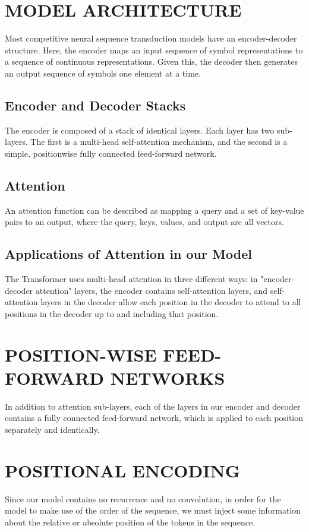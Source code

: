 \documentclass[conference]{IEEEtran}
\begin{document}
\section{MODEL ARCHITECTURE}
Most competitive neural sequence transduction models have an encoder-decoder structure. Here, the encoder maps an input sequence of symbol representations to a sequence of continuous representations. Given this, the decoder then generates an output sequence of symbols one element at a time.

\subsection{Encoder and Decoder Stacks}
The encoder is composed of a stack of identical layers. Each layer has two sub-layers. The first is a multi-head self-attention mechanism, and the second is a simple, positionwise fully connected feed-forward network.

\subsection{Attention}
An attention function can be described as mapping a query and a set of key-value pairs to an output, where the query, keys, values, and output are all vectors.

\subsection{Applications of Attention in our Model}
The Transformer uses multi-head attention in three different ways: in "encoder-decoder attention" layers, the encoder contains self-attention layers, and self-attention layers in the decoder allow each position in the decoder to attend to all positions in the decoder up to and including that position.

\section{POSITION-WISE FEED-FORWARD NETWORKS}
In addition to attention sub-layers, each of the layers in our encoder and decoder contains a fully connected feed-forward network, which is applied to each position separately and identically.

\section{POSITIONAL ENCODING}
Since our model contains no recurrence and no convolution, in order for the model to make use of the order of the sequence, we must inject some information about the relative or absolute position of the tokens in the sequence.
\end{document}
